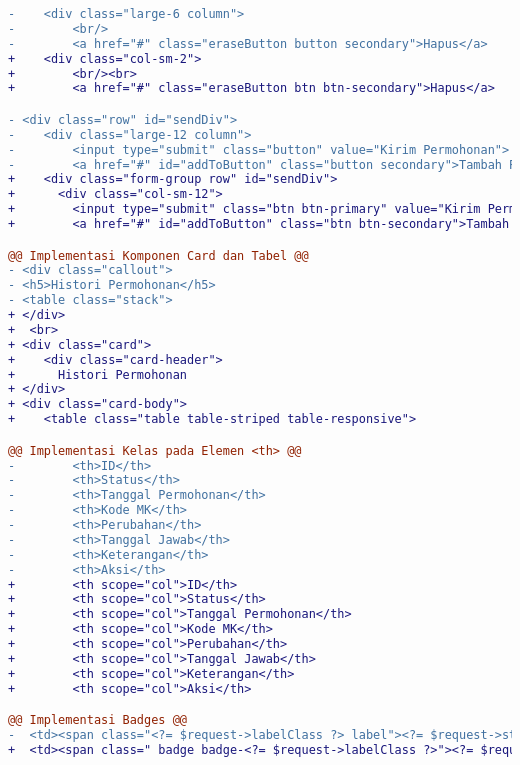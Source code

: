 \begin{lstlisting}[language=diff, caption=Kode untuk Halaman Perubahan Kuliah Request, label=Entri, basicstyle=\ttfamily, frame=single,
columns=fullflexible, keepspaces=true, breaklines=true]
-    <div class="large-6 column">
-        <br/>
-        <a href="#" class="eraseButton button secondary">Hapus</a>
+    <div class="col-sm-2">
+        <br/><br>
+        <a href="#" class="eraseButton btn btn-secondary">Hapus</a>

- <div class="row" id="sendDiv">
-    <div class="large-12 column">
-        <input type="submit" class="button" value="Kirim Permohonan">
-        <a href="#" id="addToButton" class="button secondary">Tambah Pertemuan Ekstra</a>
+    <div class="form-group row" id="sendDiv">
+      <div class="col-sm-12">
+        <input type="submit" class="btn btn-primary" value="Kirim Permohonan">
+        <a href="#" id="addToButton" class="btn btn-secondary">Tambah Pertemuan Ekstra</a>

@@ Implementasi Komponen Card dan Tabel @@
- <div class="callout">
- <h5>Histori Permohonan</h5>
- <table class="stack">
+ </div>
+  <br>
+ <div class="card">
+    <div class="card-header">
+      Histori Permohonan
+ </div>
+ <div class="card-body">
+    <table class="table table-striped table-responsive">

@@ Implementasi Kelas pada Elemen <th> @@
-        <th>ID</th>
-        <th>Status</th>
-        <th>Tanggal Permohonan</th>
-        <th>Kode MK</th>
-        <th>Perubahan</th>
-        <th>Tanggal Jawab</th>
-        <th>Keterangan</th>
-        <th>Aksi</th>
+        <th scope="col">ID</th>
+        <th scope="col">Status</th>
+        <th scope="col">Tanggal Permohonan</th>
+        <th scope="col">Kode MK</th>
+        <th scope="col">Perubahan</th>
+        <th scope="col">Tanggal Jawab</th>
+        <th scope="col">Keterangan</th>
+        <th scope="col">Aksi</th>

@@ Implementasi Badges @@
-  <td><span class="<?= $request->labelClass ?> label"><?= $request->status ?></span></td>
+  <td><span class=" badge badge-<?= $request->labelClass ?>"><?= $request->status ?></span></td>
\end{lstlisting}

